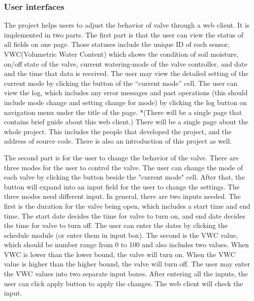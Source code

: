 \documentclass[onecolumn, draftclsnofoot,10pt, compsoc]{IEEEtran}
\begin{document}
	\subsubsection{User interfaces}
	The project helps users to adjust the behavior of valve through a web client. 
	It is implemented in two parts.
	The first part is that the user can view the status of all fields on one page.
	Those statuses include the unique ID of each sensor, VWC(Volumetric Water Content) which shows the condition of soil moisture, on/off state of the valve, current watering-mode of the valve controller, and date and the time that data is received. 
	The user may view the detailed setting of the current mode by clicking the button of the “current mode” cell.
	The user can view the log, which includes any error messages and past operations (this should include mode change and setting change for mode) by clicking the log button on navigation menu under the title of the page.
	*(There will be a single page that contains brief guide about this web client.)
	There will be a single page about the whole project. 
	This includes the people that developed the project, and the address of source code.
	There is also an introduction of this project as well.\par
	The second part is for the user to change the behavior of the valve.
	There are three modes for the user to control the valve.
	The user can change the mode of each valve by clicking the button beside the "current mode" cell. 
	After that, the button will expand into an input field for the user to change the settings.
	The three modes need different input. 
	In general, there are two inputs needed. 
	The first is the duration for the valve being open, which includes a start time and end time.
	The start date decides the time for valve to turn on, and end date decides the time for valve to turn off.
	The user can enter the dates by clicking the schedule module (or enter them in input box).
	The second is the VWC value, which should be number range from 0 to 100 and also includes two values.
	When VWC is lower than the lower bound, the valve will turn on.
	When the VWC value is higher than the higher bound, the valve will turn off.
	The user may enter the VWC values into two separate input boxes.
	After entering all the inputs, the user can click apply button to apply the changes. The web client will check the input.
	
\end{document}
